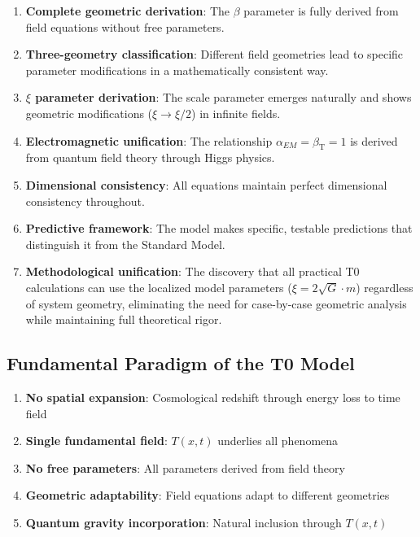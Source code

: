 \documentclass[12pt,a4paper]{article}
\newcommand{\betaT}{\beta_{\text{T}}}
\begin{document}
	\begin{enumerate}
		\item \textbf{Complete geometric derivation}: The $\beta$ parameter is fully derived from field equations without free parameters.
		
		\item \textbf{Three-geometry classification}: Different field geometries lead to specific parameter modifications in a mathematically consistent way.
		
		\item \textbf{$\xi$ parameter derivation}: The scale parameter emerges naturally and shows geometric modifications ($\xi \to \xi/2$) in infinite fields.
		
		\item \textbf{Electromagnetic unification}: The relationship $\alpha_{EM} = \betaT = 1$ is derived from quantum field theory through Higgs physics.
		
		\item \textbf{Dimensional consistency}: All equations maintain perfect dimensional consistency throughout.
		
		\item \textbf{Predictive framework}: The model makes specific, testable predictions that distinguish it from the Standard Model.
			\item \textbf{Methodological unification}: The discovery that all practical T0 calculations can use the localized model parameters ($\xi = 2\sqrt{G} \cdot m$) regardless of system geometry, eliminating the need for case-by-case geometric analysis while maintaining full theoretical rigor.
	\end{enumerate}

	
	\subsection{Fundamental Paradigm of the T0 Model}
	\label{subsec:fundamental_paradigm}
	
	\begin{tcolorbox}[colback=green!5!white,colframe=green!75!black,title=T0 Model Core Principles]
		\begin{enumerate}
			\item \textbf{No spatial expansion}: Cosmological redshift through energy loss to time field
			\item \textbf{Single fundamental field}: $T(x,t)$ underlies all phenomena
			\item \textbf{No free parameters}: All parameters derived from field theory
			\item \textbf{Geometric adaptability}: Field equations adapt to different geometries
			\item \textbf{Quantum gravity incorporation}: Natural inclusion through $T(x,t)$
		\end{enumerate}
	\end{tcolorbox}
	
\end{document}
